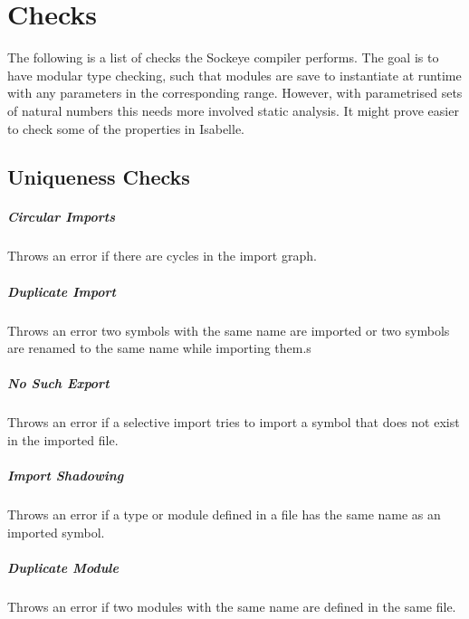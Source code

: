 \documentclass[a4paper,11pt,twoside]{report}
\begin{document}
{{{\begin{description}
\end{description}


\chapter{Checks}
\label{chap:checks}
The following is a list of checks the Sockeye compiler performs.
The goal is to have modular type checking, such that modules are save to instantiate at runtime with any parameters in the corresponding range.
However, with parametrised sets of natural numbers this needs more involved static analysis.
It might prove easier to check some of the properties in Isabelle.

\section{Uniqueness Checks}
\paragraph{Circular Imports}
Throws an error if there are cycles in the import graph.

\paragraph{Duplicate Import}
Throws an error two symbols with the same name are imported or two symbols are renamed to the same name while importing them.s

\paragraph{No Such Export}
Throws an error if a selective import tries to import a symbol that does not exist in the imported file.

\paragraph{Import Shadowing}
Throws an error if a type or module defined in a file has the same name as an imported symbol.

\paragraph{Duplicate Module}
Throws an error if two modules with the same name are defined in the same file.

}}}
\end{document}
